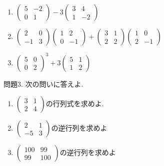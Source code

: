 \documentclass[dvipdfmx,a4paper,11pt]{article}
\theoremstyle{definition}
\begin{document}
 \begin{enumerate}
   \setlength{\parskip}{0cm} %
  \setlength{\itemsep}{0cm} %
\item 
$
 \begin{pmatrix} 5 & -2 \\ 0 & 1 \end{pmatrix}-  3 \begin{pmatrix} 3 & 4 \\ 1 & -2 \end{pmatrix}
$
\item $
\begin{pmatrix} 2 & 0 \\ -1 & 3 \end{pmatrix}\begin{pmatrix} 1 & 2 \\ 0 & -1 \end{pmatrix}
+  \begin{pmatrix} 3 & 1 \\ 2 & 2 \end{pmatrix}\begin{pmatrix} 1 & 0 \\ 2 & -1 \end{pmatrix}
$
\item $
\begin{pmatrix} 5 & 0 \\ 0 & 2 \end{pmatrix}^3 + 3 \begin{pmatrix} 5 & 1 \\ 1 & 2 \end{pmatrix}
$
 \end{enumerate}
 
 \vspace{5pt}
 
 問題3. 次の問いに答えよ.
 \begin{enumerate}
   \setlength{\parskip}{0cm} %
  \setlength{\itemsep}{0cm} %
\item $ \begin{pmatrix} 3 & 1 \\ 2 & 4 \end{pmatrix}$の行列式を求めよ.
\item $ \begin{pmatrix} 2 & 1 \\ -5& 3 \end{pmatrix}$の逆行列を求めよ
\item $ \begin{pmatrix} 100 & 99 \\ 99 & 100\end{pmatrix}$の逆行列を求めよ
 \end{enumerate}
 
\end{document}
